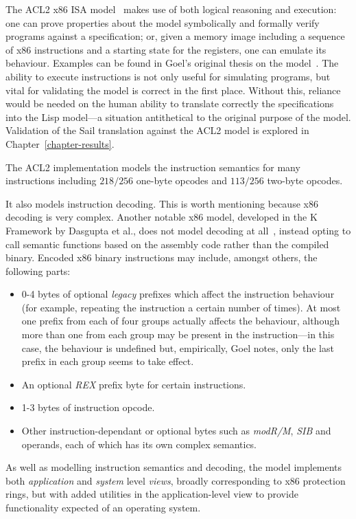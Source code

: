 \documentclass[a4paper,12pt,twoside,openright]{report}
\begin{document}
The ACL2 x86 ISA model~\cite{background-model-homepage} makes use of both logical reasoning and execution: one can prove properties about the model symbolically and formally verify programs against a specification; or, given a memory image including a sequence of x86 instructions and a starting state for the registers, one can emulate its behaviour.  Examples can be found in Goel's original thesis on the model~\cite{goel-thesis}.  The ability to execute instructions is not only useful for simulating programs, but vital for validating the model is correct in the first place.  Without this, reliance would be needed on the human ability to translate correctly the specifications into the Lisp model---a situation antithetical to the original purpose of the model.  Validation of the Sail translation against the ACL2 model is explored in Chapter~\ref{chapter-results}.

The ACL2 implementation models the instruction semantics for many instructions including $218 / 256$ one-byte opcodes and $113 / 256$ two-byte opcodes.

It also models instruction decoding.  This is worth mentioning because x86 decoding is very complex.  Another notable x86 model, developed in the K Framework by Dasgupta et al., does not model decoding at all~\cite[Introduction footnote]{k-framework}, instead opting to call semantic functions based on the assembly code rather than the compiled binary.  Encoded x86 binary instructions may include, amongst others, the following parts:

\begin{itemize}
	\item 0-4 bytes of optional \emph{legacy} prefixes which affect the instruction behaviour (for example, repeating the instruction a certain number of times).  At most one prefix from each of four groups actually affects the behaviour, although more than one from each group may be present in the instruction---in this case, the behaviour is undefined but, empirically, Goel notes, only the last prefix in each group seems to take effect.
	\item An optional \emph{REX} prefix byte for certain instructions.
	\item 1-3 bytes of instruction opcode.
	\item Other instruction-dependant or optional bytes such as \emph{modR/M}, \emph{SIB} and operands, each of which has its own complex semantics.
\end{itemize}

As well as modelling instruction semantics and decoding, the model implements both \emph{application} and \emph{system} level \emph{views}, broadly corresponding to x86 protection rings, but with added utilities in the application-level view to provide functionality expected of an operating system.
\end{document}
